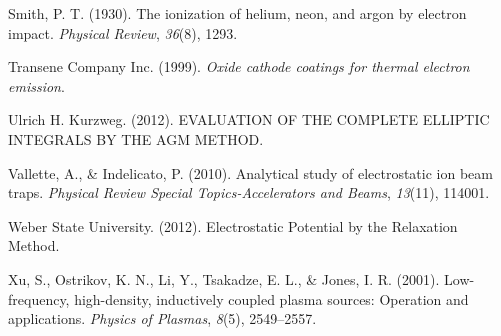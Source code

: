 \documentclass{article}
\begin{document}
\begin{thebibliography}{41}
 Smith, P. T. (1930). The ionization of helium, neon, and argon by electron impact. \textit{Physical Review}, \textit{36}(8), 1293.

 Transene Company Inc. (1999). \textit{Oxide cathode coatings for thermal electron emission}.

 Ulrich H. Kurzweg. (2012). EVALUATION OF THE COMPLETE ELLIPTIC INTEGRALS BY THE AGM METHOD.

 Vallette, A., \& Indelicato, P. (2010). Analytical study of electrostatic ion beam traps. \textit{Physical Review Special Topics-Accelerators and Beams}, \textit{13}(11), 114001.

 Weber State University. (2012). Electrostatic Potential by the Relaxation Method.

 Xu, S., Ostrikov, K. N., Li, Y., Tsakadze, E. L., \& Jones, I. R. (2001). Low-frequency, high-density, inductively coupled plasma sources: Operation and applications. \textit{Physics of Plasmas}, \textit{8}(5), 2549--2557.

\end{thebibliography}
\end{document}
